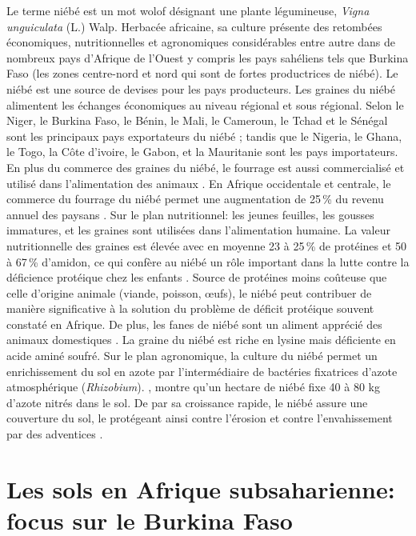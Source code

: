 \documentclass[a4paper,11pt]{article}
\begin{document}
Le terme niébé est un mot wolof désignant une plante légumineuse,
\emph{Vigna unguiculata} (L.) Walp. Herbacée africaine, sa culture
présente des retombées économiques, nutritionnelles et agronomiques
considérables entre autre dans de nombreux pays d'Afrique de l'Ouest y
compris les pays sahéliens tels que Burkina Faso (les zones
centre-nord et nord qui sont de fortes productrices de niébé). Le
niébé est une source de devises pour les pays producteurs. Les graines
du niébé alimentent les échanges économiques au niveau régional et
sous régional. Selon  le Niger, le Burkina
Faso, le Bénin, le Mali, le Cameroun, le Tchad et le Sénégal sont les
principaux pays exportateurs du niébé ; tandis que le Nigeria, le
Ghana, le Togo, la Côte d'ivoire, le Gabon, et la Mauritanie sont les
pays importateurs. En plus du commerce des graines du niébé, le
fourrage est aussi commercialisé et utilisé dans l'alimentation des
animaux \cite{Langyintuo_2003}. En Afrique occidentale et centrale, le
commerce du fourrage du niébé permet une augmentation de 25\,\% du
revenu annuel des paysans \cite{Quin_1997}. Sur le plan nutritionnel:
les jeunes feuilles, les gousses immatures, et les graines sont
utilisées dans l'alimentation humaine. La valeur nutritionnelle des
graines est élevée avec en moyenne 23 à 25\,\% de protéines et 50 à
67\,\% d'amidon, ce qui confère au niébé un rôle important dans la
lutte contre la déficience protéique chez les enfants
\cite{Quin_1997}. Source de protéines moins coûteuse que celle
d'origine animale (viande, poisson, œufs), le niébé peut contribuer de
manière significative à la solution du problème de déficit protéique
souvent constaté en Afrique. De plus, les fanes de niébé sont un
aliment apprécié des animaux domestiques \cite{BAMBARA_2008}. La
graine du niébé est riche en lysine mais déficiente en acide aminé
soufré. Sur le plan agronomique, la culture du niébé permet un
enrichissement du sol en azote par l'intermédiaire de bactéries
fixatrices d'azote atmosphérique
(\emph{Rhizobium}). , montre qu'un hectare de niébé
fixe 40 à 80 kg d'azote nitrés dans le sol. De par sa croissance
rapide, le niébé assure une couverture du sol, le protégeant ainsi
contre l'érosion et contre l'envahissement par des adventices
\cite{Sawadogo_2009}.

\section{Les sols en Afrique subsaharienne: focus sur le Burkina Faso}
\end{document}

